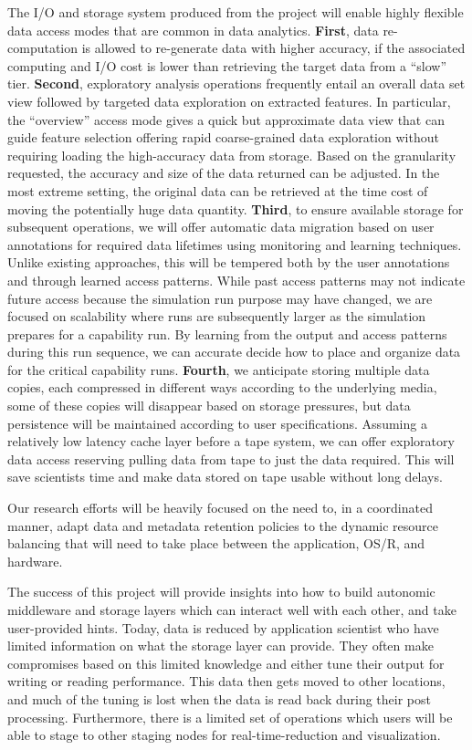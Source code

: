 \documentclass[11pt,letterpaper]{article}
\begin{document}
The I/O and storage system produced from the project will
enable highly flexible data access modes that are common in data analytics. 
\textbf{First}, data re-computation is allowed to re-generate
data with higher accuracy, if the associated computing and I/O cost is lower
than retrieving the target data from a ``slow'' tier. 
\textbf{Second}, exploratory analysis
operations frequently entail an overall data set view followed by targeted data
exploration on extracted features. 
In particular, the ``overview'' access mode gives a quick but approximate
data view that can guide feature selection offering rapid coarse-grained data
exploration without requiring loading the high-accuracy data from
storage. Based on the granularity requested, the accuracy and size of the data
returned can be adjusted. In the most extreme setting, the original data can
be retrieved at the time cost of moving the potentially huge data quantity.
\textbf{Third}, to ensure available storage for subsequent operations, we will
offer automatic data migration based on user annotations for required data
lifetimes using monitoring and learning techniques. Unlike existing approaches,
this will be tempered both by the user annotations and through learned access
patterns.  While past access patterns may not indicate future access because
the simulation run purpose may have changed, we are focused on scalability
where runs are subsequently larger as the simulation prepares for a capability
run.  By learning from the output and access patterns during this run sequence,
we can accurate decide how to place and organize data for the critical
capability runs. 
\textbf{Fourth}, we anticipate storing multiple data copies, each
compressed in different ways according to the underlying media, some of these
copies will disappear based on storage pressures, but data persistence will be
maintained according to user specifications. Assuming a relatively low latency
cache layer before a tape system, we can offer exploratory data access
reserving pulling data from tape to just the data required. This will save
scientists time and make data stored on tape usable without long delays.

Our research efforts will be heavily focused on the need to, in a coordinated
manner, adapt data and metadata retention policies to the dynamic resource
balancing that will need to take place between the application, OS/R, and
hardware.

The success of this project will  provide insights into how to build autonomic
middleware and storage layers which can interact well with each other, and take
user-provided hints. Today, data is reduced by application scientist who have
limited information on what the storage layer can provide. They often make
compromises based on this limited knowledge and either tune their output for
writing or reading performance. This data then gets moved to other locations,
and much of the tuning is lost when the data is read back during their post
processing. Furthermore, there is a limited set of operations which users will
be able to stage to other staging nodes for real-time-reduction and
visualization. 


%
\end{document}
